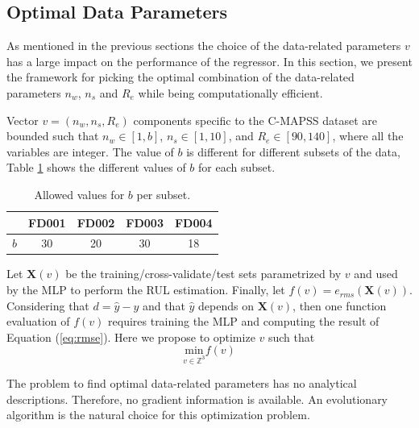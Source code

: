 \documentclass[preprint,12pt]{elsarticle}%
\begin{document}
\subsection{Optimal Data Parameters}

\label{sec:otimal_data_params}

As mentioned in the previous sections the choice of the data-related
parameters $v$ has a large impact on the performance of the regressor. In this
section, we present the framework for picking the optimal combination of the
data-related parameters $n_{w}$, $n_{s}$ and $R_{e}$ while being
computationally efficient.

Vector $v = (n_{w}, n_{s}, R_{e})$ components specific to the C-MAPSS dataset are
bounded such that $n_{w} \in\left[  1, b\right]  $, $n_{s} \in\left[  1,
10\right]  $, and $R_{e} \in\left[  90, 140 \right]  $, where all the
variables are integer. The value of $b$ is different for different subsets of
the data, Table \ref{table:b_values} shows the different values of $b$ for
each subset.

\begin{table}[!htb]
\begin{center}
\begin{tabular}
[c]{c|cccc}\hline
& FD001 & FD002 & FD003 & FD004\\\hline
$b$ & 30 & 20 & 30 & 18\\\hline
\end{tabular}
\caption{Allowed values for $b$ per subset.}
\label{table:b_values}
\end{center}
\end{table}

Let $\mathbf{X}(v)$ be the training/cross-validate/test sets parametrized by $v$ and
used by the MLP to perform the RUL estimation. Finally, let $f(v)=e_{rms}%
(\mathbf{X}(v))$. Considering that $d = \hat{y} - y$ and that
$\hat{y}$ depends on $\mathbf{X}(v)$, then one function evaluation of $f(v)$
requires training the MLP and computing the result of Equation (\ref{eq:rmse}).
Here we propose to optimize $v$ such that
\begin{equation}
\underset{v \in\mathbb{Z}^{3}}{\mathrm{min}} f(v)
\label{eq:optimization_problem}%
\end{equation}

The problem to find optimal data-related parameters has no analytical
descriptions. Therefore, no gradient information is available. An evolutionary
algorithm is the natural choice for this optimization problem.
\end{document}
